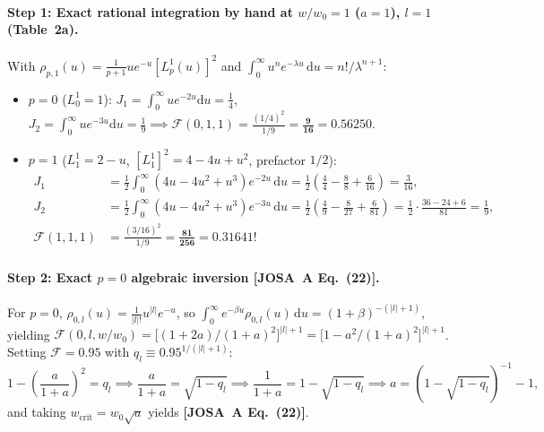 \documentclass[10pt,letterpaper]{article}
\newcommand{\abs}[1]{\lvert #1 \rvert}
\newcommand{\dd}{\mathrm{d}}
\newcommand{\josa}[1]{\textbf{[JOSA~A Eq.~(#1)]}}
\numberwithin{equation}{section}
\begin{document}
\paragraph*{Step 1: Exact rational integration by hand at $w/w_0 = 1$ ($a = 1$), $l = 1$ (Table~2a).}
With $\rho_{p,1}(u) = \frac{1}{p+1} u e^{-u}[L_p^1(u)]^2$ and $\int_0^\infty u^n e^{-\lambda u}\,\dd u = n!/\lambda^{n+1}$:
\begin{itemize}[leftmargin=1.5em,itemsep=1pt,topsep=2pt]
  \item $p = 0$ ($L_0^1 = 1$): $J_1 = \int_0^\infty u e^{-2u}\dd u = \frac{1}{4}$, $J_2 = \int_0^\infty u e^{-3u}\dd u = \frac{1}{9} \implies \mathcal{F}(0,1,1) = \frac{(1/4)^2}{1/9} = \mathbf{\frac{9}{16} = 0.56250}$.
  \item $p = 1$ ($L_1^1 = 2 - u$, $[L_1^1]^2 = 4 - 4u + u^2$, prefactor $1/2$):
    \begin{align*}
      J_1 &= \frac{1}{2}\int_0^\infty (4u - 4u^2 + u^3)e^{-2u}\,\dd u = \frac{1}{2}\left(\frac{4}{4} - \frac{8}{8} + \frac{6}{16}\right) = \frac{3}{16}, \\
      J_2 &= \frac{1}{2}\int_0^\infty (4u - 4u^2 + u^3)e^{-3u}\,\dd u = \frac{1}{2}\left(\frac{4}{9} - \frac{8}{27} + \frac{6}{81}\right) = \frac{1}{2}\cdot\frac{36 - 24 + 6}{81} = \frac{1}{9}, \\
      \mathcal{F}(1,1,1) &= \frac{(3/16)^2}{1/9} = \mathbf{\frac{81}{256} = 0.31641}!
    \end{align*}
\end{itemize}
\paragraph*{Step 2: Exact $p = 0$ algebraic inversion \josa{22}.}
For $p = 0$, $\rho_{0,l}(u) = \frac{1}{\abs{l}!} u^{\abs{l}} e^{-u}$, so $\int_0^\infty e^{-\beta u}\rho_{0,l}(u)\,\dd u = (1+\beta)^{-(\abs{l}+1)}$, yielding $\mathcal{F}(0,l,w/w_0) = \bigl[(1+2a)/(1+a)^2\bigr]^{\abs{l}+1} = \bigl[1 - a^2/(1+a)^2\bigr]^{\abs{l}+1}$. Setting $\mathcal{F} = 0.95$ with $q_l \equiv 0.95^{1/(\abs{l}+1)}$:
\begin{equation}
  1 - \left(\frac{a}{1+a}\right)^2 = q_l \implies \frac{a}{1+a} = \sqrt{1-q_l} \implies \frac{1}{1+a} = 1 - \sqrt{1-q_l} \implies a = \left(1 - \sqrt{1-q_l}\right)^{-1} - 1,
\end{equation}
and taking $w_{\mathrm{crit}} = w_0\sqrt{a}$ yields \josa{22}.
\end{document}
